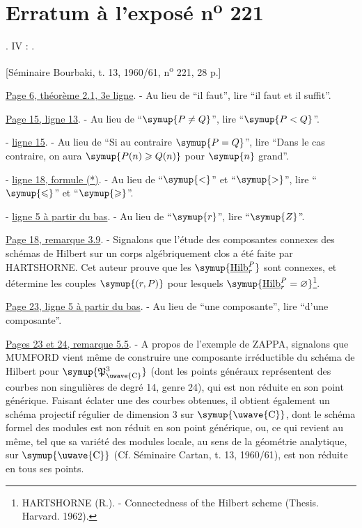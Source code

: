 \clearpage
\chapter*{Erratum à l'exposé n\textsuperscript{o} 221}
\setcounter{footnote}{3}
\begingroup
\makeatletter
\renewcommand\@makefnmark{\hbox{\normalfont(\textsuperscript{\@thefnmark})}}
\makeatother

.  IV : .

\begin{center}
[Séminaire Bourbaki, t. 13, 1960/61, n\textsuperscript{o} 221, 28 p.]
\end{center}

\noindent\uline{Page 6, théorème 2.1, 3e ligne}. - Au lieu
de ``il faut'', lire ``il faut et il suffit''.

\noindent\uline{Page 15, ligne 13}. - Au lieu de ``$\symup{P\neq Q}$'', lire
``$\symup{P<Q}$''.

\noindent- \quad \uline{ligne 15}. - Au lieu de ``Si au contraire $\symup{P=Q}$'', lire
``Dans le cas contraire, on aura $\symup{P(n)\geqslant Q(n)}$ pour $\symup{n}$ grand''.

\noindent- \quad \uline{ligne 18, formule (*)}. - Au lieu de ``$\symup{<}$'' et ``$\symup{>}$'',
lire ``$\symup{\leqslant}$'' et ``$\symup{\geqslant}$''.

\noindent- \quad \uline{ligne 5 à partir du bas}. - Au lieu de ``$\symup{r}$'', lire
``$\symup{Z}$''.

\noindent\uline{Page 18, remarque 3.9}. - Signalons que l'étude des
composantes connexes des schémas de Hilbert sur un corps algébriquement clos a
été faite par HARTSHORNE. Cet auteur prouve que les
$\symup{\underline{\operatorname{Hilb}}^{P}_{r}}$ sont connexes, et détermine les couples $\symup{(r,P)}$
pour lesquels $\symup{\underline{\operatorname{Hilb}}^{P}_{r}=\varnothing}$\footnote[4]{HARTSHORNE
(R.). - Connectedness of the Hilbert scheme (Thesis. Harvard. 1962).}.

\noindent\uline{Page 23, ligne 5 à partir du bas}. - Au lieu de ``une
composante'', lire ``d'une composante''.

\noindent\uline{Pages 23 et 24, remarque 5.5}. - A propos de l'exemple de
ZAPPA, signalons que MUMFORD vient même de construire une composante
irréductible du schéma de Hilbert pour $\symup{\mathfrak P^3_{\text{\uwave{C}}}}$ (dont les
points généraux représentent des courbes non singulières de degré 14, genre
24), qui est non réduite en son point générique. Faisant éclater une des
courbes obtenues, il obtient également un schéma projectif régulier de
dimension 3 sur $\symup{\text{\uwave{C}}}$, dont le schéma formel des modules est non réduit
en son point générique, ou, ce qui revient au même, tel que sa variété des
modules locale, au sens de la géométrie analytique, sur $\symup{\text{\uwave{C}}}$ (Cf.
Séminaire Cartan, t. 13, 1960/61), est non réduite en tous ses points.
\endgroup
